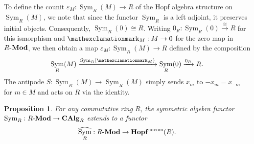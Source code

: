 \documentclass{amsart}
\newtheorem{proposition}[equation]{Proposition}
\theoremstyle{definition}
\newcommand{\bang}{\mathexclamationmark}
\DeclareMathOperator{\sym}{Sym}
\newcommand{\CAlg}[1]{\mathbf{CAlg}_{#1}}
\newcommand{\Sym}[1]{\sym_{#1}}
\let\epsilon\varepsilon
\let\epsilon\varepsilon
\newcommand{\Mod}[1]{{#1}\textnormal{-}\mathbf{Mod}}
\numberwithin{equation}{subsection}
\begin{document}
To define the counit $\epsilon_M:\Sym{R}(M) \to R$ of the Hopf algebra structure on $\Sym{R}(M)$, we note that since the functor $\Sym{R}$ is a left adjoint, it preserves initial objects. Consequently, $\Sym{R}(0) \cong R$. Writing $0_R:\Sym{R}(0) \xrightarrow{\cong} R$ for this ismorphism and $\bang_M:M \to 0$ for the zero map in $\Mod{R}$, we then obtain a map $\epsilon_M:\Sym{R}(M) \to R$ defined by the composition
\begin{equation*}\label{Eqn: Section Background Alg: The counit map}
\Sym{R}(M) \xrightarrow{\Sym{R}(\bang_M)} \Sym{R}(0) \xrightarrow{0_R} R.
\end{equation*}
The antipode $S:\Sym{R}(M) \to \Sym{R}(M)$ simply sends $x_m$ to $-x_{m} = x_{-m}$ for $m \in M$ and acts on $R$ via the identity.
\begin{proposition}\label{Prop: Section Background Alg: Symmetric Alg is Coalg}
For any commutative ring $R$, the symmetric algebra functor $\Sym{R}:\Mod{R} \to \CAlg{R}$ extends to a functor 
\[
\widehat{\Sym{R}}:\Mod{R} \to \mathbf{Hopf}^{\operatorname{cocom}}(R).
\]
\end{proposition}
\end{document}
